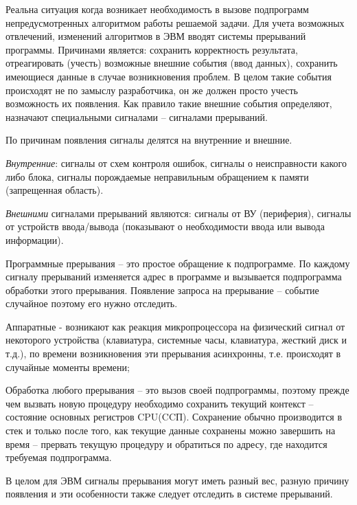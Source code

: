 \documentclass[unicode, 12pt, a4paper, oneside]{article}
\begin{document}
Реальна ситуация когда возникает необходимость в вызове подпрограмм непредусмотренных алгоритмом работы решаемой задачи. Для учета возможных отвлечений, изменений алгоритмов в ЭВМ вводят системы прерываний программы. Причинами является: сохранить корректность результата, отреагировать (учесть) возможные внешние события (ввод данных), сохранить имеющиеся данные в случае возникновения проблем. В целом такие события происходят не по замыслу разработчика, он же должен просто учесть возможность их появления. Как правило такие внешние события определяют, назначают специальными сигналами – сигналами  прерываний.

По причинам появления сигналы делятся на внутренние и внешние. 

\textit{Внутренние}: сигналы от схем контроля ошибок, сигналы о неисправности какого либо блока, сигналы порождаемые неправильным обращением к памяти (запрещенная область).
       
\textit{Внешними} сигналами прерываний являются: сигналы от ВУ (периферия), сигналы от устройств ввода/вывода (показывают о необходимости ввода или вывода информации).

Программные прерывания – это простое обращение к подпрограмме. По каждому сигналу прерываний изменяется адрес в программе и вызывается подпрограмма обработки этого прерывания. Появление запроса на прерывание – событие случайное поэтому его нужно отследить.

Аппаратные - возникают как реакция микропроцессора на физический сигнал от некоторого устройства (клавиатура, системные часы, клавиатура, жесткий диск и т.д.), по времени возникновения эти прерывания асинхронны, т.е. происходят в случайные моменты времени; 

Обработка любого прерывания – это вызов своей подпрограммы, поэтому прежде чем вызвать новую процедуру необходимо сохранить текущий контекст – состояние основных регистров CPU(CCП). Сохранение обычно производится в стек и только после того, как текущие данные сохранены можно завершить на время – прервать текущую процедуру и обратиться по адресу, где находится требуемая подпрограмма.

В целом для ЭВМ сигналы прерывания могут иметь разный вес, разную причину появления и эти особенности также следует отследить в системе прерываний.
\end{document}
